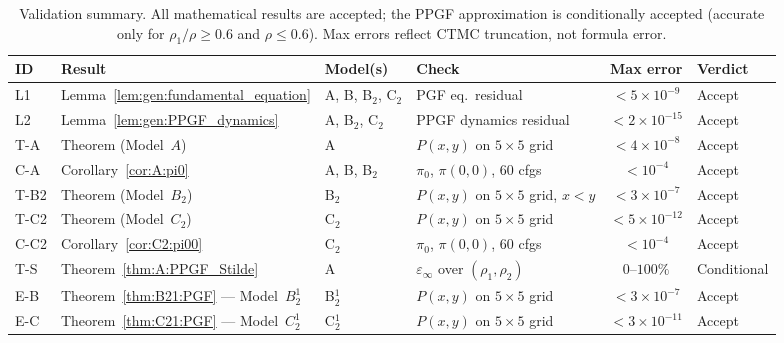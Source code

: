 \begin{table}[H]
\centering
\caption{Validation summary.  All mathematical results are accepted; the PPGF
approximation is conditionally accepted (accurate only for $\rho_1/\rho\ge0.6$
and $\rho\le0.6$).  Max errors reflect CTMC truncation, not formula error.}
\label{tab:validation_summary}
\renewcommand{\arraystretch}{1.35}
\begin{tabular}{llllcl}
\hline
\textbf{ID} & \textbf{Result} & \textbf{Model(s)} & \textbf{Check} & \textbf{Max error} & \textbf{Verdict} \\
\hline
L1   & Lemma~\ref{lem:gen:fundamental_equation}  & A, B, B$_2$, C$_2$ & PGF eq.\ residual             & $<5\times10^{-9}$  & Accept \\
L2   & Lemma~\ref{lem:gen:PPGF_dynamics}         & A, B$_2$, C$_2$    & PPGF dynamics residual        & $<2\times10^{-15}$ & Accept \\
T-A  & Theorem (Model~$A$)                         & A                  & $P(x,y)$ on $5\times5$ grid   & $<4\times10^{-8}$  & Accept \\
C-A  & Corollary~\ref{cor:A:pi0}                 & A, B, B$_2$        & $\pi_0$, $\pi(0,0)$, 60 cfgs  & $<10^{-4}$         & Accept \\
T-B2 & Theorem (Model~$B_2$)                     & B$_2$              & $P(x,y)$ on $5\times5$ grid, $x<y$   & $<3\times10^{-7}$  & Accept \\
T-C2 & Theorem (Model~$C_2$)                     & C$_2$              & $P(x,y)$ on $5\times5$ grid   & $<5\times10^{-12}$ & Accept \\
C-C2 & Corollary~\ref{cor:C2:pi00}               & C$_2$              & $\pi_0$, $\pi(0,0)$, 60 cfgs  & $<10^{-4}$         & Accept \\
T-S  & Theorem~\ref{thm:A:PPGF_Stilde}           & A                  & $\varepsilon_\infty$ over $(\rho_1,\rho_2)$ & $0$--$100\%$ & Conditional \\
\hline
E-B  & Theorem~\ref{thm:B21:PGF} — Model~$B_2^1$  & B$_2^1$            & $P(x,y)$ on $5\times5$ grid                 & $<3\times10^{-7}$  & Accept \\
E-C  & Theorem~\ref{thm:C21:PGF} — Model~$C_2^1$ & C$_2^1$            & $P(x,y)$ on $5\times5$ grid                 & $<3\times10^{-11}$ & Accept \\
\hline
\end{tabular}
\end{table}

